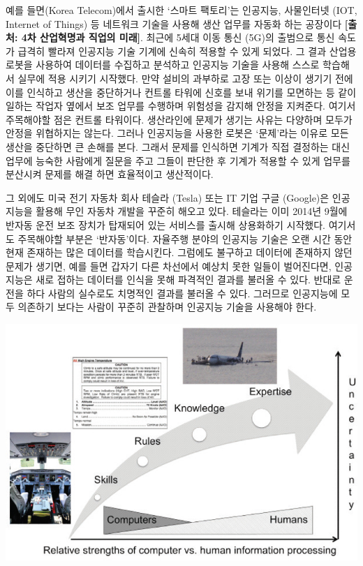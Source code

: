 \documentclass[smallextended]{svjour3}       %
\begin{document}
예를 들면(Korea Telecom)에서 출시한 `스마트 팩토리'는 인공지능,
사물인터넷 (IOT, Internet of Things) 등 네트워크 기술을 사용해 생산
업무를 자동화 하는 공장이다 \textbf{{[}출처: 4차 산업혁명과 직업의
미래{]}}. 최근에 5세대 이동 통신 (5G)의 출범으로 통신 속도가 급격히
빨라져 인공지능 기술 기계에 신속히 적용할 수 있게 되었다. 그 결과 산업용
로봇을 사용하여 데이터를 수집하고 분석하고 인공지능 기술을 사용해 스스로
학습해서 실무에 적용 시키기 시작했다. 만약 설비의 과부하로 고장 또는
이상이 생기기 전에 이를 인식하고 생산을 중단하거나 컨트롤 타워에 신호를
보내 위기를 모면하는 등 같이 일하는 작업자 옆에서 보조 업무를 수행하며
위험성을 감지해 안정을 지켜준다. 여기서 주목해야할 점은 컨트롤 타워이다.
생산라인에 문제가 생기는 사유는 다양하며 모두가 안정을 위협하지는
않는다. 그러나 인공지능을 사용한 로봇은 `문제'라는 이유로 모든 생산을
중단하면 큰 손해를 본다. 그래서 문제를 인식하면 기계가 직접 결정하는
대신 업무에 능숙한 사람에게 질문을 주고 그들이 판단한 후 기계가 적용할
수 있게 업무를 분산시켜 문제를 해결 하면 효율적이고 생산적이다.

그 외에도 미국 전기 자동차 회사 테슬라 (Tesla) 또는 IT 기업 구글
(Google)은 인공지능을 활용해 무인 자동차 개발을 꾸준히 해오고 있다.
테슬라는 이미 2014년 9월에 반자동 운전 보조 장치가 탑재되어 있는
서비스를 출시해 상용화하기 시작했다. 여기서도 주목해야할 부분은
`반자동'이다. 자율주행 분야의 인공지능 기술은 오랜 시간 동안 현재
존재하는 많은 데이터를 학습시킨다. 그럼에도 불구하고 데이터에 존재하지
않던 문제가 생기면, 예를 들면 갑자기 다른 차선에서 예상치 못한 일들이
벌어진다면, 인공지능은 새로 접하는 데이터를 인식을 못해 파격적인 결과를
불러올 수 있다. 반대로 운전을 하다 사람의 실수로도 치명적인 결과를
불러올 수 있다. 그러므로 인공지능에 모두 의존하기 보다는 사람이 꾸준히
관찰하며 인공지능 기술을 사용해야 한다.

\begin{center}\includegraphics[width=0.77\linewidth]{fig/role-allocation-skill-rules-experties} \end{center}
\end{document}
